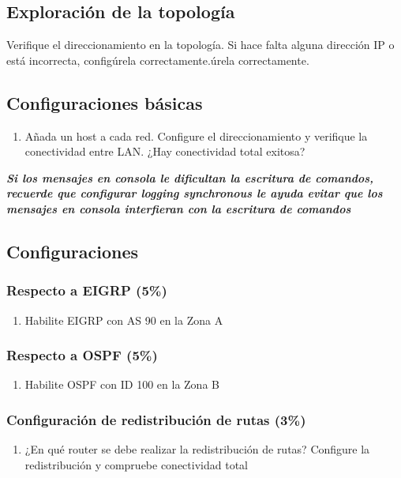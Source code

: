 \documentclass[12pt]{article}
\begin{document}
\subsection{Exploración de la topología}
Verifique el direccionamiento en la topología. Si hace falta alguna dirección IP o está incorrecta, configúrela correctamente.úrela correctamente.
\subsection{Configuraciones básicas}
\begin{enumerate}[label=\Alph*]
\item Añada un host a cada red. Configure el direccionamiento y verifique la conectividad entre LAN. ¿Hay conectividad total exitosa?
\end{enumerate}
\textit{\textbf{Si los mensajes en consola le dificultan la escritura de comandos, recuerde que configurar logging synchronous le ayuda evitar que los mensajes en consola interfieran con la escritura de comandos}} 

\subsection{Configuraciones}
\subsubsection{Respecto a \textbf{EIGRP} (5\%)}
\begin{enumerate}
\item Habilite EIGRP con AS 90 en la Zona A
\end{enumerate}

\subsubsection{Respecto a \textbf{OSPF} (5\%)}
\begin{enumerate}
\item Habilite OSPF con ID 100 en la Zona B
\end{enumerate}

\subsubsection{Configuración de redistribución de rutas (3\%)}
\begin{enumerate}
\item ¿En qué router se debe realizar la redistribución de rutas? Configure la redistribución y compruebe conectividad total
\end{enumerate}
\end{document}
